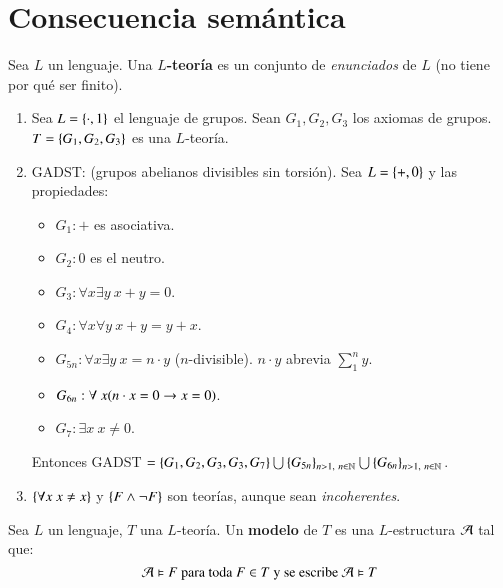 
\chapter{Consecuencia semántica}

\begin{dfn}[$L$-teoría]
    Sea $L$ un lenguaje. Una \textbf{$L$-teoría} es un conjunto de \textit{enunciados} de $L$ (no tiene por qué ser finito).
\end{dfn}

\begin{eg}
    \begin{enumerate}
        \item Sea $L = \left\{\cdot, 1\right\}$ el lenguaje de grupos. Sean $G_1, G_2, G_3$ los axiomas de grupos. $T = \left\{G_1, G_2, G_3\right\}$ es una $L$-teoría.
        \item GADST: (grupos abelianos divisibles sin torsión). Sea $L = \left\{+, 0\right\}$ y las propiedades:
            \begin{itemize}
                \item $G_1: +$ es asociativa.
                \item $G_2: 0$ es el neutro.
                \item $G_3: \forall x \exists y\ x+y = 0$.
                \item $G_4: \forall x \forall y\ x+y=y+x$.
                \item $G_{5n}: \forall x \exists y\ x = n \cdot y$ ($n$-divisible). $n \cdot y$ abrevia $\sum_1^n y$.
                \item $G_{6n}: \forall\ x (n\cdot x = 0 \rightarrow x = 0)$.
                \item $G_7: \exists x\ x\neq 0$.
            \end{itemize}
            Entonces GADST $= \left\{G_1, G_2, G_3, G_3, G_7\right\} \bigcup \left\{G_{5n}\right\}_{n>1,\ n \in \mathbb{N}} \bigcup \left\{G_{6n}\right\}_{n>1,\ n \in \mathbb{N}}$.
        \item $\left\{\forall x\ x \neq x\right\}$ y $\left\{F \land \neg F\right\}$ son teorías, aunque sean \textit{incoherentes}.
    \end{enumerate}
\end{eg}

\begin{dfn}[Modelo]
    Sea $L$ un lenguaje, $T$ una $L$-teoría. Un \textbf{modelo} de $T$ es una $L$-estructura $\mathcal{A}$ tal que:
    $$
        \mathcal{A} \vDash F \text{ para toda } F \in T \text{ y se escribe } \mathcal{A} \vDash T
    $$
\end{dfn}

